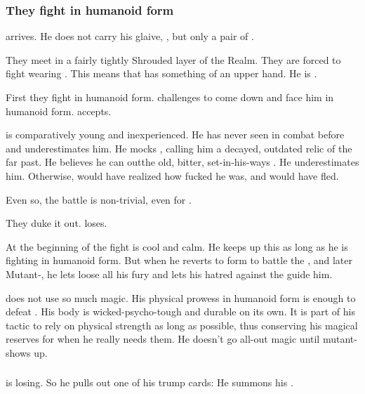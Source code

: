 \subsubsection{They fight in humanoid form}
\Ishnaruchaefir{} arrives. 
He does not carry his glaive, \Rystessakhin, but only a pair of \skekrathuins. 

They meet in a fairly tightly Shrouded layer of the Realm. 
They are forced to fight wearing . 
This means that \Teshrial{} has something of an upper hand. 
He is . 

First they fight in humanoid form. 
\Teshrial{} challenges \Ishnaruchaefir{} to come down and face him in humanoid form. 
\Ishnaruchaefir{} accepts. 

\Teshrial{} is comparatively young and inexperienced. 
He has never seen \Ishnaruchaefir{} in combat before and underestimates him. 
He mocks \Ishnaruchaefir, calling him a decayed, outdated relic of the far past. 
He believes he can out\manoeuvre the old, bitter, set-in-his-ways \shaeeroth.
He underestimates him. 
Otherwise, \Teshrial{} would have realized how fucked he was, and would have fled. 

Even so, the battle is non-trivial, even for \Ishnaruchaefir. 

They duke it out. 
\Teshrial{} loses. 

At the beginning of the fight \Ishnaruchaefir{} is cool and calm. 
He keeps up this \facade{} as long as he is fighting in humanoid form. 
But when he reverts to \draconian{} form to battle the \noggyaleth{}, and later Mutant-\Teshrial, he lets loose all his \draconian{} fury and lets his hatred against the \resphain{} guide him. 

\Ishnaruchaefir{} does not use so much magic. 
His physical prowess in humanoid form is enough to defeat \Teshrial{}. 
His body is wicked-psycho-tough and durable on its own. 
It is part of his tactic to rely on physical strength as long as possible, thus conserving his magical reserves for when he really needs them. 
He doesn't go all-out magic until mutant-\Teshrial{} shows up. 





\subsubsection{\Noggyaleth}
\Teshrial{} is losing. 
So he pulls out one of his trump cards: 
He summons his \noggyaleth. 

